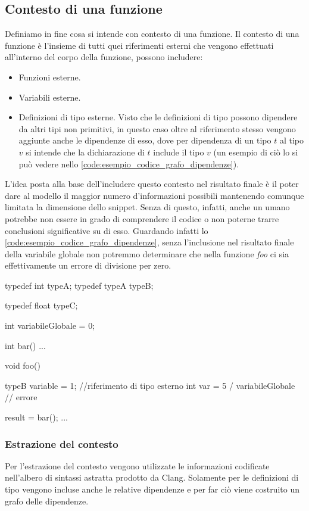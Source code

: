 \subsection{Contesto di una funzione} \label{subsec:context}
Definiamo in fine cosa si intende con contesto di una funzione.
Il contesto di una funzione è l'insieme di tutti quei riferimenti esterni che vengono effettuati all'interno del corpo della funzione, possono includere:
  \begin{itemize}
    \item Funzioni esterne.
    \item Variabili esterne.
    \item Definizioni di tipo esterne. Visto che le definizioni di tipo possono dipendere da altri tipi non primitivi, in questo caso oltre al riferimento stesso vengono aggiunte anche le dipendenze di esso, dove per dipendenza di un tipo $t$ al tipo $v$ si intende che la dichiarazione di $t$ include il tipo $v$ (un esempio di ciò lo si può vedere nello \autoref{code:esempio_codice_grafo_dipendenze}).
  \end{itemize}
L'idea posta alla base dell'includere questo contesto nel risultato finale è il poter dare al modello il maggior numero d'informazioni possibili mantenendo comunque limitata la dimensione dello snippet.
Senza di questo, infatti, anche un umano potrebbe non essere in grado di comprendere il codice o non poterne trarre conclusioni significative su di esso. 
Guardando infatti lo \autoref{code:esempio_codice_grafo_dipendenze}, senza l'inclusione nel risultato finale della variabile globale non potremmo determinare che nella funzione \textit{foo} ci sia effettivamente un errore di divisione per zero.

\begin{code}[language=c++, caption={Esempio di codice con riferimenti esterni}, label={code:esempio_codice_grafo_dipendenze}]

  typedef int typeA;
  typedef typeA typeB; 

  typedef float typeC;

  int variabileGlobale = 0;

  int bar(){
    ...
  }

  void foo(){
    typeB variable = 1; //riferimento di tipo esterno
    int var = 5 / variabileGlobale // errore
    
    result = bar();
    ...
  }

\end{code}

\subsubsection{Estrazione del contesto}\label{sec:estrazione_contesto}
Per l'estrazione del contesto vengono utilizzate le informazioni codificate nell'albero di sintassi astratta prodotto da Clang.
Solamente per le definizioni di tipo vengono incluse anche le relative dipendenze e per far ciò viene costruito un grafo delle dipendenze.

